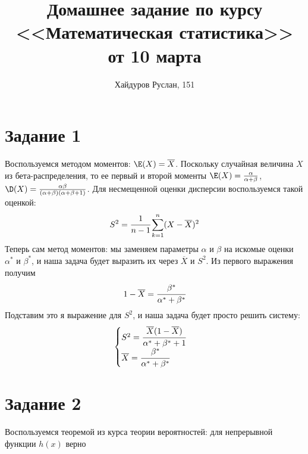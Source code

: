 \documentclass{article}
\title{Домашнее задание по курсу <<Математическая статистика>> от 10 марта}
\author{Хайдуров Руслан, 151}
\begin{document}
\maketitle
\section{Задание 1}
Воспользуемся методом моментов: $\E(X) = \overline{X}$. Поскольку случайная величина $X$ из бета-распределения, то ее первый и второй моменты $\E(X) = \frac{\alpha}{\alpha + \beta}$, $\D(X) = \frac{\alpha \beta}{(\alpha + \beta)(\alpha + \beta +1)}$. Для несмещенной оценки дисперсии воспользуемся такой оценкой:
$$
    S^2 = \cfrac{1}{n-1}\sum\limits_{k = 1}^{n}(X - \overline{X})^2
$$
Теперь сам метод моментов: мы заменяем параметры $\alpha$ и $\beta$ на искомые оценки $\alpha^*$ и $\beta^*$, и наша задача будет выразить их через $\overline{X}$ и $S^2$. Из первого выражения получим
$$
    1 - \overline{X} = \cfrac{\beta^*}{\alpha^* + \beta^*}
$$
Подставим это я выражение для $S^2$, и наша задача будет просто решить систему:
$$
	\begin{cases}
		S^2 = \cfrac{\overline{X}(1 - \overline{X})}{\alpha^* + \beta^* + 1}\\
		\overline{X} = \cfrac{\beta^*}{\alpha^* + \beta^*}
	\end{cases}
$$
\section{Задание 2}
Воспользуемся теоремой из курса теории вероятностей: для непрерывной функции $h(x)$ верно 
\end{document}
